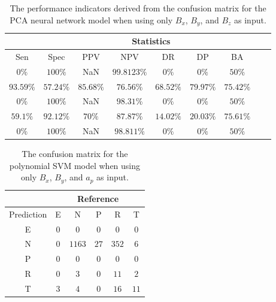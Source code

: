 \begin{table}[!ht]
	\centering
	\begin{tabular}{|c|c|c|c|c|c|c|c|c|}
		\hline
		 & \multicolumn{7}{c|}{Statistics} \\ \hline
		Sen & Spec & PPV & NPV & DR & DP & BA \\ \hline
		$0\%$ & $100\%$ & NaN & $99.8123\%$ & $0\%$ & $0\%$ & $50\%$ \\ \hline
		$93.59\%$ & $57.24\%$ & $85.68\%$ & $76.56\%$ & $68.52\%$ & $79.97\%$ & $75.42\%$ \\ \hline
		$0\%$ & $100\%$ & NaN & $98.31\%$ & $0\%$ & $0\%$ & $50\%$ \\ \hline
		$59.1\%$ & $92.12\%$ & $70\%$ & $87.87\%$ & $14.02\%$ & $20.03\%$ & $75.61\%$ \\ \hline
		$0\%$ & $100\%$ & NaN & $98.811\%$ & $0\%$ & $0\%$ & $50\%$ \\ \hline
	\end{tabular}
	\caption{The performance indicators derived from the confusion matrix for the PCA neural network model when using only $B_{x}$, $B_{y}$, and $B_{z}$ as input.}
	\label{tab:cs:coord:pcaNNet}
\end{table}

\begin{table}[!ht]
	\centering
	\begin{tabular}{|c|c|c|c|c|c|}
		\hline
		 & \multicolumn{5}{|c|}{Reference} \\ \hline
		 Prediction & E & N & P & R & T \\ \hline
		 E & $0$ & $0$ & $0$ & $0$ & $0$ \\ \hline
		 N & $0$ & $1163$ & $27$ & $352$ & $6$ \\ \hline
		 P & $0$ & $0$ & $0$ & $0$ & $0$ \\ \hline
		 R & $0$ & $3$ & $0$ & $11$ & $2$ \\ \hline
		 T & $3$ & $4$ & $0$ & $16$ & $11$ \\ \hline
	\end{tabular}
	\caption{The confusion matrix for the polynomial SVM model when using only $B_{x}$, $B_{y}$, and $a_{p}$ as input.}
	\label{tab:cm:xyap:svmPoly}
\end{table}

